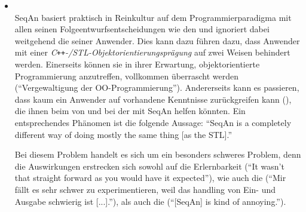 \begin{itemize}
\begin{itemize}
     \item[\codebullet{apiua://code/-9223372036854775633}] \textbf{}\label{sec:stl-inconsistencies} \\
     SeqAn basiert praktisch in Reinkultur auf dem Programmierparadigma  mit allen seinen Folgeentwurfsentscheidungen wie den  und ignoriert dabei weitgehend die  seiner Anwender. Dies kann dazu führen dazu, dass Anwender mit einer \textit{C\texttt{++}-/STL-Objektorientierungsprägung} auf zwei Weisen behindert werden. Einerseits können sie in ihrer Erwartung, objektorientierte Programmierung anzutreffen, vollkommen überrascht werden (``Vergewaltigung der OO-Programmierung''). Andererseits kann es passieren, dass kaum ein Anwender auf vorhandene Kenntnisse zurückgreifen kann (), die ihnen beim  von und bei der  mit SeqAn helfen könnten. Ein entsprechendes Phänomen ist die folgende Aussage: ``SeqAn is a completely different way of doing mostly the same thing [as the STL].''
     
     Bei diesem Problem handelt es sich um ein besonders schweres Problem, denn die Auswirkungen erstrecken sich sowohl auf die Erlernbarkeit (``It wasn't that straight forward as you would have it expected''), wie auch die  (``Mir fällt es sehr schwer zu experimentieren, weil das handling von Ein- und Ausgabe schwierig ist [...].''), als auch die  (``[SeqAn] is kind of annoying.'').
     

\end{itemize}
\end{itemize}
